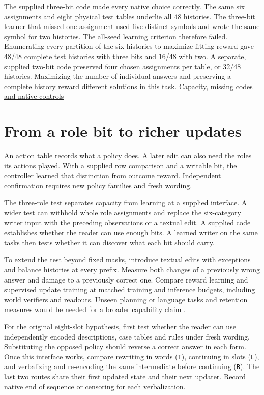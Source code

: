 \documentclass[11pt]{article}
\begin{document}
The supplied three-bit code made every native choice correctly. The same six assignments and eight physical test tables underlie all 48 histories. The three-bit learner that missed one assignment used five distinct symbols and wrote the same symbol for two histories. The all-seed learning criterion therefore failed. Enumerating every partition of the six histories to maximize fitting reward gave 48/48 complete test histories with three bits and 16/48 with two. A separate, supplied two-bit code preserved four chosen assignments per table, or 32/48 histories. Maximizing the number of individual answers and preserving a complete history reward different solutions in this task. \href{https://github.com/RyoSpiralArchitect/self-fold/blob/v1.0.0/provenance/preprint_v1_20261104/RESULTS.md#six-histories-through-a-discrete-message}{Capacity, missing codes and native controls}

\section{From a role bit to richer updates}

An action table records what a policy does. A later edit can also need the roles its actions played. With a supplied row comparison and a writable bit, the controller learned that distinction from outcome reward. Independent confirmation requires new policy families and fresh wording.

The three-role test separates capacity from learning at a supplied interface. A wider test can withhold whole role assignments and replace the six-category writer input with the preceding observations or a textual edit. A supplied code establishes whether the reader can use enough bits. A learned writer on the same tasks then tests whether it can discover what each bit should carry.

To extend the test beyond fixed masks, introduce textual edits with exceptions and balance histories at every prefix. Measure both changes of a previously wrong answer and damage to a previously correct one. Compare reward learning and supervised update training at matched training and inference budgets, including world verifiers and readouts. Unseen planning or language tasks and retention measures would be needed for a broader capability claim \citep{kumar2024score,gao2022overoptimization}.

For the original eight-slot hypothesis, first test whether the reader can use independently encoded descriptions, case tables and rules under fresh wording. Substituting the opposed policy should reverse a correct answer in each form. Once this interface works, compare rewriting in words (\texttt{T}), continuing in slots (\texttt{L}), and verbalizing and re-encoding the same intermediate before continuing (\texttt{B}). The last two routes share their first updated state and their next updater. Record native end of sequence or censoring for each verbalization.
\end{document}
